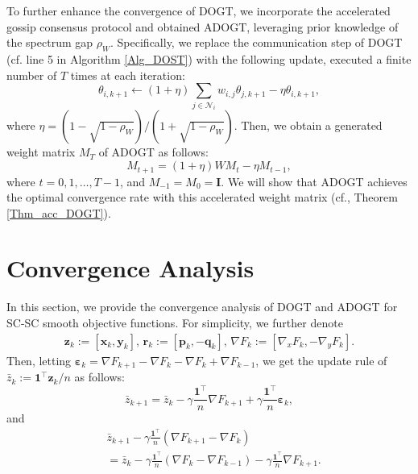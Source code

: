 \documentclass[letterpaper, 10 pt, conference]{ieeeconf}
\begin{document}
To further enhance the convergence of DOGT, we incorporate the accelerated gossip consensus protocol \cite{liu2011accelerated} and obtained ADOGT, leveraging prior knowledge of the spectrum gap $\rho_W$. Specifically, we replace the communication step of DOGT (cf. line 5 in Algorithm \ref{Alg_DOST}) with the following update, executed a finite number of $T$ times at each iteration:
\begin{equation}\label{Eq_acc_consensus}
\theta _{i,k+1}\gets \left( 1+\eta \right) \sum_{j\in \mathcal{N} _i}{w_{i,j}\theta _{j,k+1}}-\eta \theta _{i,k+1},
\end{equation}
where $\eta =\left( 1-\sqrt{1-\rho _W} \right) /\left( 1+\sqrt{1-\rho _W} \right)$. Then, we obtain a generated weight matrix $M_T$ of ADOGT as follows:
\begin{equation}\label{Eq_weight_matrix_M}
M_{t+1}=\left( 1+\eta \right) WM_t-\eta M_{t-1},
\end{equation}
where $t=0,1,\dots,T-1$, and $M_{-1}=M_0=\mathbf{I}$. We will show that ADOGT achieves the optimal convergence rate with this accelerated weight matrix (cf., Theorem \ref{Thm_acc_DOGT}).


\section{Convergence Analysis}\label{Sec_convergence}

In this section, we provide the convergence analysis of DOGT and ADOGT for SC-SC smooth objective functions. For simplicity, we further denote
\begin{equation*}
\begin{aligned}
\mathbf{z}_k:=\left[ \mathbf{x}_k, \mathbf{y}_k \right] ,\,
\mathbf{r}_k:=\left[ \mathbf{p}_k, -\mathbf{q}_k \right],\,
\nabla F_k:=\left[ \nabla _xF_k, -\nabla _yF_k \right].
\end{aligned}
\end{equation*}
Then, letting $\boldsymbol{\varepsilon }_k=\nabla F_{k+1}-\nabla F_k-\nabla F_k+\nabla F_{k-1}$, we get the update rule of $\bar{z}_k:=\mathbf{1}^{\top}\mathbf{z}_k/n$ as follows:
\begin{equation}
\bar{z}_{k+1}=\bar{z}_k-\gamma \frac{\mathbf{1}^{\top}}{n}\nabla F_{k+1} +\gamma \frac{\mathbf{1}^{\top}}{n}\boldsymbol{\varepsilon }_k,
\end{equation}
and
\begin{equation}\label{Eq_update_z_ave}
\begin{aligned}
&\bar{z}_{k+1}-\gamma \frac{\mathbf{1}^{\top}}{n}\left( \nabla F_{k+1}-\nabla F_k \right) 
\\
&=\bar{z}_k-\gamma \frac{\mathbf{1}^{\top}}{n}\left( \nabla F_k-\nabla F_{k-1} \right) -\gamma \frac{\mathbf{1}^{\top}}{n}\nabla F_{k+1}.
\end{aligned}
\end{equation}
\end{document}
